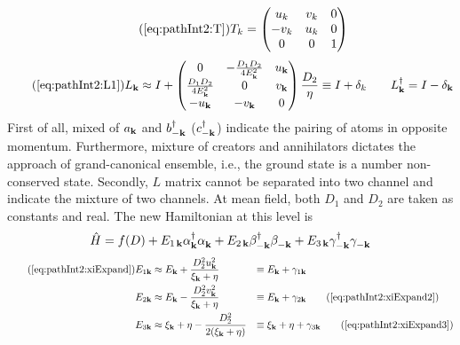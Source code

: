 \begin{equation}\tag{\ref{eq:pathInt2:T}}
T_k=\mtrx{u_k&v_k&0\\-v_k&u_k&0\\0&0&1}
\end{equation}
\begin{equation}\tag{\ref{eq:pathInt2:L1}}
L_{\vk}\approx{}I+
\mtrx{0&-\frac{D_{1}{}D_{2}{}}{4E^{2}_{\vk}}&u_{\vk}\\
\frac{D_{1}{}D_{2}{}}{4E^{2}_{\vk}}&0&v_{\vk}\\
-u_{\vk}&-v_{\vk}&0
}\frac{D_{2}{}}{\eta}
\equiv{}I+\delta_{k}\qquad
L^{\dg}_{\vk}=I-\delta_{\vk}
\end{equation}
First of all, mixed of $a_{\mathbf{k}}$ and $b^{\dagger}_{-\mathbf{k}}$ ($c^{\dagger}_{-\mathbf{k}}$) indicate the pairing of atoms in opposite momentum. Furthermore,   mixture of creators and annihilators dictates the approach of grand-canonical ensemble, i.e., the ground state is a number non-conserved state.   Secondly, $L$ matrix cannot be separated into two channel and indicate the mixture of two channels.   At mean field, both $D_{1}$ and $D_{2}$ are taken as constants and real.  The new Hamiltonian at this level is 
\begin{equation}
\hat{H}=f(D)+E_{1\,\mathbf{k}}\alpha^{\dagger}_{\mathbf{k}}\alpha^{}_{\mathbf{k}}
+E_{2\,\mathbf{k}}\beta^{\dagger}_{-\mathbf{k}}\beta^{}_{-\mathbf{k}}+E_{3\,\mathbf{k}}\gamma^{\dagger}_{-\mathbf{k}}\gamma^{}_{-\mathbf{k}}
\end{equation}
\begin{align}\tag{\ref{eq:pathInt2:xiExpand}}
E_{1\vk}&\approx{}E_{\vk}+\frac{D_{2}^{2}u_{\vk}^{2}}{\xi_{\vk}+\eta}&\equiv{}&E_{\vk}+\gamma_{1\vk}\\
E_{2\vk}&\approx{}E_{\vk}-\frac{D_{2}^{2}v_{\vk}^{2}}{\xi_{\vk}+\eta}&\equiv{}&E_{\vk}+\gamma_{2\vk}
\tag{\ref{eq:pathInt2:xiExpand2}}\\
E_{3\vk}&\approx{}\xi_{\vk}+\eta-\frac{D_{2}^{2}}{2(\xi_{\vk}+\eta)}&\equiv{}&\xi_{\vk}+\eta+\gamma_{3\vk}
\tag{\ref{eq:pathInt2:xiExpand3}}
\end{align}


